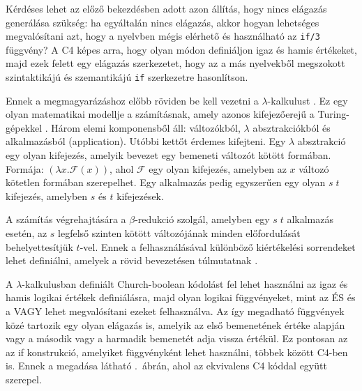Kérdéses lehet az előző bekezdésben adott azon állítás, hogy nincs elágazás generálása szükség: ha egyáltalán nincs elágazás, akkor hogyan lehetséges megvalósítani azt, hogy a nyelvben mégis elérhető és használható az {\tt if/3} függvény?
A C4 képes arra, hogy olyan módon definiáljon igaz és hamis értékeket, majd ezek felett egy elágazás szerkezetet, hogy az a más nyelvekből megszokott szintaktikájú és szemantikájú {\tt if} szerkezetre hasonlítson.

Ennek a megmagyarázáshoz előbb röviden be kell vezetni a $\lambda$-kalkulust \cite{churchSetPostulatesFoundation1932}.
Ez egy olyan matematikai modellje a számításnak, amely azonos kifejezőerejű a Turing-gépekkel \cite{turingComputabilityLdefinability1937}.
Három elemi komponensből áll: változókból, $\lambda$ absztrakciókból és alkalmazásból (application).
Utóbbi kettőt érdemes kifejteni. 
Egy $\lambda$ absztrakció egy olyan kifejezés, amelyik bevezet egy bemeneti változót kötött formában. 
Formája: $(\lambda x.\mathcal{F}(x))$, ahol $\mathcal{F}$ egy olyan kifejezés, amelyben az $x$ változó kötetlen formában szerepelhet.
Egy alkalmazás pedig egyszerűen egy olyan $s\;t$ kifejezés, amelyben $s$ és $t$ kifejezések.

A számítás végrehajtására a $\beta$-redukció szolgál, amelyben egy $s\;t$ alkalmazás esetén, az $s$ legfelső szinten kötött változójának minden előfordulását behelyettesítjük $t$-vel.
Ennek a felhasználásával különböző kiértékelési sorrendeket lehet definiálni, amelyek a rövid bevezetésen túlmutatnak \cite{Sestoft2002}.

A $\lambda$-kalkulusban definiált Church-boolean \cite[2.4.2.~szekció]{kempTheoreticalFoundationsPractical2007} kódolást fel lehet használni az igaz és hamis logikai értékek definiálásra, majd olyan logikai függvényeket, mint az ÉS és a VAGY lehet megvalósítani ezeket felhasználva.
Az így megadható függvények közé tartozik egy olyan elágazás is, amelyik az első bemenetének értéke alapján vagy a második vagy a harmadik bemenetét adja vissza értékül.
Ez pontosan az az if konstrukció, amelyiket függvényként lehet használni, többek között C4-ben is.
Ennek a megadása látható .~ábrán, ahol az ekvivalens C4 kóddal együtt szerepel.

